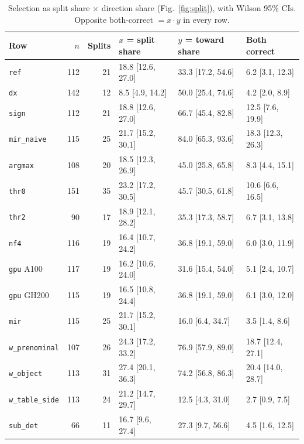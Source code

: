\documentclass[conference]{IEEEtran}
\newcommand{\rowid}[1]{\texttt{#1}}
\begin{document}
\begin{table}[t]
\centering
\scriptsize
\setlength{\tabcolsep}{2.2pt}
\caption{Selection as split share $\times$ direction share (Fig.~\ref{fig:split}), with Wilson 95\% CIs. Opposite both-correct $=x\cdot y$ in every row.}
\label{tab:decomp}
\begin{tabular}{@{}l r r l l l@{}}
\toprule
Row & $n$ & Splits & $x$ = split share & $y$ = toward share & Both correct\\
\midrule
\rowid{ref} & 112 & 21 & 18.8 [12.6, 27.0] & 33.3 [17.2, 54.6] & 6.2 [3.1, 12.3]\\
\rowid{dx} & 142 & 12 & 8.5 [4.9, 14.2] & 50.0 [25.4, 74.6] & 4.2 [2.0, 8.9]\\
\rowid{sign} & 112 & 21 & 18.8 [12.6, 27.0] & 66.7 [45.4, 82.8] & 12.5 [7.6, 19.9]\\
\rowid{mir\_naive} & 115 & 25 & 21.7 [15.2, 30.1] & 84.0 [65.3, 93.6] & 18.3 [12.3, 26.3]\\
\rowid{argmax} & 108 & 20 & 18.5 [12.3, 26.9] & 45.0 [25.8, 65.8] & 8.3 [4.4, 15.1]\\
\rowid{thr0} & 151 & 35 & 23.2 [17.2, 30.5] & 45.7 [30.5, 61.8] & 10.6 [6.6, 16.5]\\
\rowid{thr2} & 90 & 17 & 18.9 [12.1, 28.2] & 35.3 [17.3, 58.7] & 6.7 [3.1, 13.8]\\
\rowid{nf4} & 116 & 19 & 16.4 [10.7, 24.2] & 36.8 [19.1, 59.0] & 6.0 [3.0, 11.9]\\
\rowid{gpu} A100 & 117 & 19 & 16.2 [10.6, 24.0] & 31.6 [15.4, 54.0] & 5.1 [2.4, 10.7]\\
\rowid{gpu} GH200 & 115 & 19 & 16.5 [10.8, 24.4] & 36.8 [19.1, 59.0] & 6.1 [3.0, 12.0]\\
\rowid{mir} & 115 & 25 & 21.7 [15.2, 30.1] & 16.0 [6.4, 34.7] & 3.5 [1.4, 8.6]\\
\rowid{w\_prenominal} & 107 & 26 & 24.3 [17.2, 33.2] & 76.9 [57.9, 89.0] & 18.7 [12.4, 27.1]\\
\rowid{w\_object} & 113 & 31 & 27.4 [20.1, 36.3] & 74.2 [56.8, 86.3] & 20.4 [14.0, 28.7]\\
\rowid{w\_table\_side} & 113 & 24 & 21.2 [14.7, 29.7] & 12.5 [4.3, 31.0] & 2.7 [0.9, 7.5]\\
\rowid{sub\_det} & 66 & 11 & 16.7 [9.6, 27.4] & 27.3 [9.7, 56.6] & 4.5 [1.6, 12.5]\\
\bottomrule
\end{tabular}
\end{table}
\end{document}

